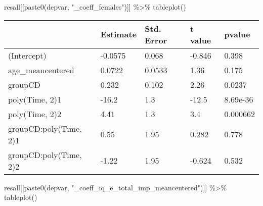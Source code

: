 \documentclass[
]{article}
\newenvironment{Shaded}{\begin{snugshade}}{\end{snugshade}}
\newcommand{\FunctionTok}[1]{\textcolor[rgb]{0.00,0.00,0.00}{#1}}
\newcommand{\NormalTok}[1]{#1}
\newcommand{\SpecialCharTok}[1]{\textcolor[rgb]{0.00,0.00,0.00}{#1}}
\newcommand{\StringTok}[1]{\textcolor[rgb]{0.31,0.60,0.02}{#1}}
\begin{document}
\begin{Shaded}
\begin{Highlighting}[]
\NormalTok{resall[[}\FunctionTok{paste0}\NormalTok{(depvar, }\StringTok{"\_coeff\_females"}\NormalTok{)]] }\SpecialCharTok{\%\textgreater{}\%} \FunctionTok{tableplot}\NormalTok{()}
\end{Highlighting}
\end{Shaded}

\begin{table}
\centering
\begin{tabular}[t]{l|l|l|l|l}
\hline
  & Estimate & Std. Error & t value & pvalue\\
\hline
(Intercept) & -0.0575 & 0.068 & -0.846 & 0.398\\
\hline
age\_meancentered & 0.0722 & 0.0533 & 1.36 & 0.175\\
\hline
groupCD & 0.232 & 0.102 & 2.26 & 0.0237\\
\hline
poly(Time, 2)1 & -16.2 & 1.3 & -12.5 & 8.69e-36\\
\hline
poly(Time, 2)2 & 4.41 & 1.3 & 3.4 & 0.000662\\
\hline
groupCD:poly(Time, 2)1 & 0.55 & 1.95 & 0.282 & 0.778\\
\hline
groupCD:poly(Time, 2)2 & -1.22 & 1.95 & -0.624 & 0.532\\
\hline
\end{tabular}
\end{table}

\begin{Shaded}
\begin{Highlighting}[]
\NormalTok{resall[[}\FunctionTok{paste0}\NormalTok{(depvar, }\StringTok{"\_coeff\_iq\_e\_total\_imp\_meancentered"}\NormalTok{)]] }\SpecialCharTok{\%\textgreater{}\%} \FunctionTok{tableplot}\NormalTok{()}
\end{Highlighting}
\end{Shaded}
\end{document}
